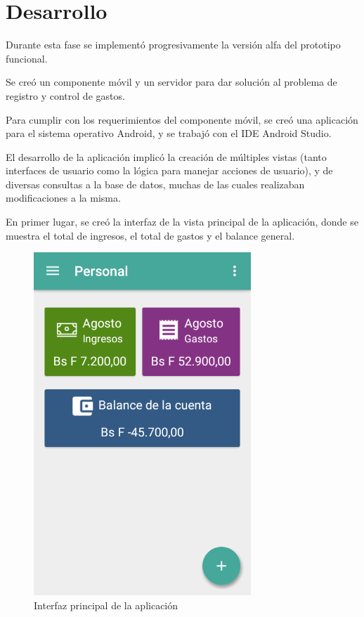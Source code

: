 \section{Desarrollo} \label{sect:desarrollo}

Durante esta fase se implementó progresivamente la versión alfa del prototipo funcional. 

Se creó un componente móvil y un servidor para dar solución al problema de registro y control de gastos.

Para cumplir con los requerimientos del componente móvil, se creó una aplicación para el sistema operativo Android, y se trabajó con el IDE Android Studio. 

El desarrollo de la aplicación implicó la creación de múltiples vistas (tanto interfaces de usuario como la lógica para manejar acciones de usuario), y de diversas consultas a la base de datos, muchas de las cuales realizaban modificaciones a la misma.

En primer lugar, se creó la interfaz de la vista principal de la aplicación, donde se muestra el total de ingresos, el total de gastos y el balance general.

\begin{figure}[ht]
  \centering
  \includegraphics[scale=0.45,type=png,ext=.png,read=.png]{imagenes/dashboard}
  \caption{Interfaz principal de la aplicación}
  \label{fig:interfazDashboard}
\end{figure}

